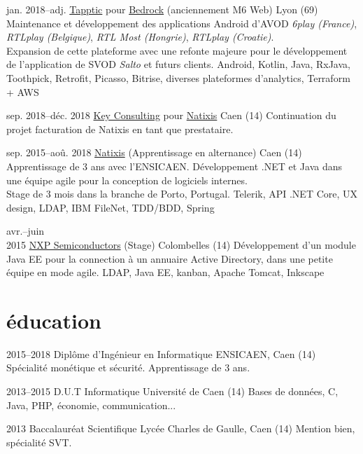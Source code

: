 \documentclass[]{friggeri-cv}
\begin{document}
\begin{entrylist}
    \entry
    {jan. 2018--adj.}
    {\href{https://www.tapptic.com}{Tapptic} \textnormal{pour} \href{https://www.bedrockstreaming.com}{Bedrock} (anciennement M6 Web)}
    {Lyon (69)}
    {Maintenance et développement des applications Android d'AVOD \emph{6play (France)}, \emph{RTLplay (Belgique)}, \emph{RTL Most (Hongrie)}, \emph{RTLplay (Croatie)}. \\Expansion de cette plateforme avec une refonte majeure pour le développement de l'application de SVOD \emph{Salto} et futurs clients.}
    {Android, Kotlin, Java, RxJava, Toothpick, Retrofit, Picasso, Bitrise, diverses plateformes d'analytics, Terraform + AWS}

    \entry
    {sep. 2018--déc. 2018}
    {\href{https://www.keyconsulting.fr}{Key Consulting} \textnormal{pour} \href{https://www.natixis.com}{Natixis}}
    {Caen (14)}
    {Continuation du projet facturation de Natixis en tant que prestataire.}{}

    \entry
    {sep. 2015--aoû. 2018}
    {\href{https://www.natixis.com}{Natixis} \textnormal{(Apprentissage en alternance)}}
    {Caen (14)}
    {Apprentissage de 3 ans avec l’ENSICAEN. Développement \csharp .NET et Java dans une équipe agile pour la conception de logiciels internes.\\Stage de 3 mois dans la branche de Porto, Portugal.}
    {Telerik, API .NET Core, UX design, LDAP, IBM FileNet, TDD/BDD, Spring}

    \entry
    {avr.--juin\\2015}
    {\href{https://www.nxp.com}{NXP Semiconductors} \textnormal{(Stage)}}
    {Colombelles (14)}
    {Développement d’un module Java EE pour la connection à un annuaire Active Directory, dans une petite équipe en mode agile.}
    {LDAP, Java EE, kanban, Apache Tomcat, Inkscape}
\end{entrylist}

\section{éducation}

\begin{entrylist}
    \entry
    {2015--2018}
    {Diplôme d’Ingénieur {\normalfont en Informatique}}
    {ENSICAEN, Caen (14)}
    {Spécialité monétique et sécurité. Apprentissage de 3 ans.}{}

    \entry
    {2013--2015}
    {D.U.T {\normalfont Informatique}}
    {Université de Caen (14)}
    {Bases de données, C, Java, PHP, économie, communication...}{}

    \entry
    {2013}
    {Baccalauréat {\normalfont Scientifique}}
    {Lycée Charles de Gaulle, Caen (14)}
    {Mention bien, spécialité SVT.}{}
\end{entrylist}
\end{document}
